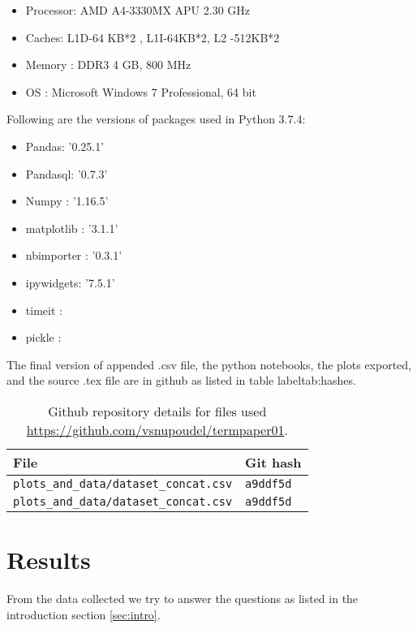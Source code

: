\documentclass[sigconf, nonacm, natbib, screen, balance=False]{acmart}
\begin{document}
\begin{itemize}
\item Processor:    AMD A4-3330MX APU  2.30 GHz
\item Caches:       L1D-64 KB*2 , L1I-64KB*2, L2 -512KB*2
\item Memory :      DDR3 4 GB, 800 MHz
\item OS :          Microsoft Windows 7 Professional, 64 bit
\end{itemize}


Following are the versions of packages used in Python 3.7.4:
\begin{multicols}{2}
\begin{itemize}
\item Pandas:    '0.25.1'
\item Pandasql:    '0.7.3'
\item Numpy :      '1.16.5'
\item matplotlib :   '3.1.1'
\item nbimporter :  '0.3.1'
\item ipywidgets: '7.5.1'
\item timeit :         
\item pickle :  
\end{itemize}
\end{multicols}

The final version of appended .csv file, the python notebooks, the plots exported, and the source .tex file are in github as listed in table label{tab:hashes}.

\begin{table}[ht]
  \caption{Github repository details for files used 
    \url{https://github.com/vsnupoudel/termpaper01}.}
  \label{tab:hashes}
  \begin{tabular}{ll}
    \hline
    File & Git hash \\\hline
    \verb!plots_and_data/dataset_concat.csv! & \verb!a9ddf5d! \\
        \verb!plots_and_data/dataset_concat.csv! & \verb!a9ddf5d! \\
  \end{tabular}
\end{table}

\section{Results}\label{sec:results}
From the data collected we try to answer the questions as listed in the introduction section \ref{sec:intro}.
\end{document}
